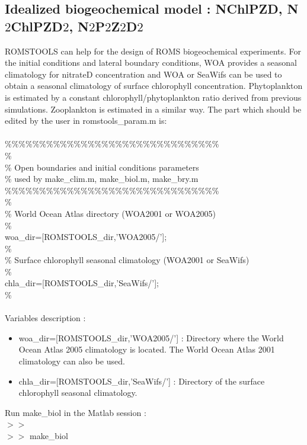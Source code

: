 \subsection{Idealized biogeochemical model : NChlPZD, N$2$ChlPZD$2$, N$2$P$2$Z$2$D$2$}
ROMSTOOLS can help for the design of ROMS biogeochemical
experiments. For the initial conditions and lateral boundary
conditions, WOA provides a seasonal climatology for nitrateD
concentration and WOA or SeaWifs can be used to obtain a 
seasonal climatology of surface chlorophyll concentration.
Phytoplankton is estimated by a constant chlorophyll/phytoplankton 
ratio derived from previous simulations. Zooplankton is estimated
in a similar way. The part which should be edited by the user in 
romstools\_param.m is:\\
\\ 
\%\%\%\%\%\%\%\%\%\%\%\%\%\%\%\%\%\%\%\%\%\%\%\%\%\%\%\%\%\%\%\\
\%\\
\% Open boundaries and initial conditions parameters\\
\%   used by make\_clim.m, make\_biol.m, make\_bry.m\\
\%\%\%\%\%\%\%\%\%\%\%\%\%\%\%\%\%\%\%\%\%\%\%\%\%\%\%\%\%\%\%\\
\%\\
\% World Ocean Atlas directory (WOA2001 or WOA2005) \\
\%\\
woa\_dir=[ROMSTOOLS\_dir,'WOA2005/'];\\
\%\\
\% Surface chlorophyll seasonal climatology (WOA2001 or SeaWifs)\\
\%\\
chla\_dir=[ROMSTOOLS\_dir,'SeaWifs/'];\\
\%\\\\
Variables description :
\begin{itemize}
\item woa\_dir=[ROMSTOOLS\_dir,'WOA2005/'] : Directory where the World Ocean
Atlas 2005 climatology \citep{Con02} is located. The World Ocean
Atlas 2001 climatology can also be used.
\item chla\_dir=[ROMSTOOLS\_dir,'SeaWifs/'] : Directory of the surface 
chlorophyll seasonal climatology.
\end{itemize}
Run make\_biol in the Matlab session :\\
$>>$\\
$>>$ make\_biol\\\\
